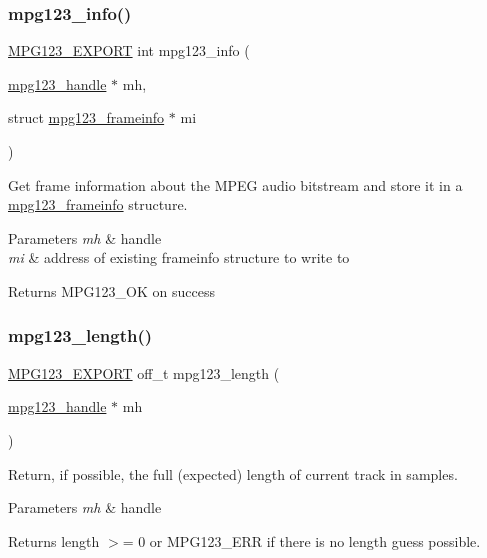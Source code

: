 \subsubsection{\texorpdfstring{mpg123\_info()}{mpg123\_info()}}
{\footnotesize\ttfamily \mbox{\hyperlink{mpg123_8h_a2ba98cfba3f760879df70e755b2a61cc}{M\+P\+G123\+\_\+\+E\+X\+P\+O\+RT}} int mpg123\+\_\+info (\begin{DoxyParamCaption}\item[{\mbox{\hyperlink{group__mpg123__init_ga6728e2839a395f3a07d4514da659faca}{mpg123\+\_\+handle}} $\ast$}]{mh,  }\item[{struct \mbox{\hyperlink{structmpg123__frameinfo}{mpg123\+\_\+frameinfo}} $\ast$}]{mi }\end{DoxyParamCaption})}

Get frame information about the M\+P\+EG audio bitstream and store it in a \mbox{\hyperlink{structmpg123__frameinfo}{mpg123\+\_\+frameinfo}} structure. 
\begin{DoxyParams}{Parameters}
{\em mh} & handle \\
\hline
{\em mi} & address of existing frameinfo structure to write to \\
\hline
\end{DoxyParams}
\begin{DoxyReturn}{Returns}
M\+P\+G123\+\_\+\+OK on success 
\end{DoxyReturn}
\mbox{\label{group__mpg123__status_ga7a97295f5dd82795489d9ed8ee544805}} 
\subsubsection{\texorpdfstring{mpg123\_length()}{mpg123\_length()}}
{\footnotesize\ttfamily \mbox{\hyperlink{mpg123_8h_a2ba98cfba3f760879df70e755b2a61cc}{M\+P\+G123\+\_\+\+E\+X\+P\+O\+RT}} off\+\_\+t mpg123\+\_\+length (\begin{DoxyParamCaption}\item[{\mbox{\hyperlink{group__mpg123__init_ga6728e2839a395f3a07d4514da659faca}{mpg123\+\_\+handle}} $\ast$}]{mh }\end{DoxyParamCaption})}

Return, if possible, the full (expected) length of current track in samples. 
\begin{DoxyParams}{Parameters}
{\em mh} & handle \\
\hline
\end{DoxyParams}
\begin{DoxyReturn}{Returns}
length $>$= 0 or M\+P\+G123\+\_\+\+E\+RR if there is no length guess possible. 
\end{DoxyReturn}
\mbox{\label{group__mpg123__status_gafdb7e99795ac9915f47d0e1985ce3968}} 
